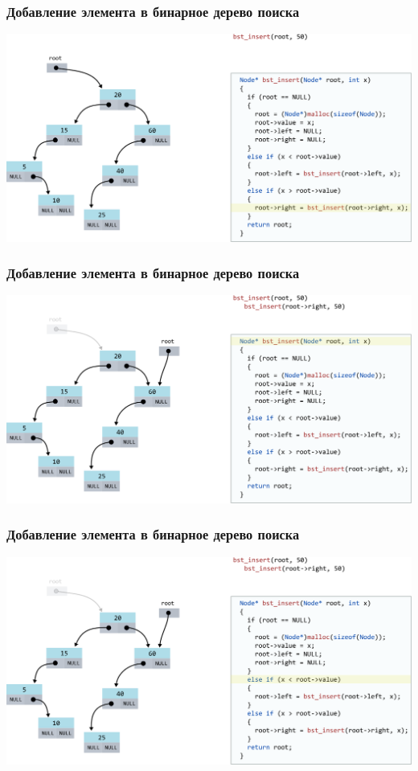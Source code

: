 \documentclass[10pt,pdf,hyperref={unicode}]{beamer}
\begin{document}
\begin{frame}[fragile]
\frametitle{Добавление элемента в бинарное дерево поиска}
\begin{center}
\includegraphics[width=\imageSizeMult\linewidth]{../images/codetree/codetree3.png}
\end{center}
\end{frame}

\begin{frame}[fragile]
\frametitle{Добавление элемента в бинарное дерево поиска}
\begin{center}
\includegraphics[width=\imageSizeMult\linewidth]{../images/codetree/codetree4.png}
\end{center}
\end{frame}

\begin{frame}[fragile]
\frametitle{Добавление элемента в бинарное дерево поиска}
\begin{center}
\includegraphics[width=\imageSizeMult\linewidth]{../images/codetree/codetree5.png}
\end{center}
\end{frame}
\end{document}
